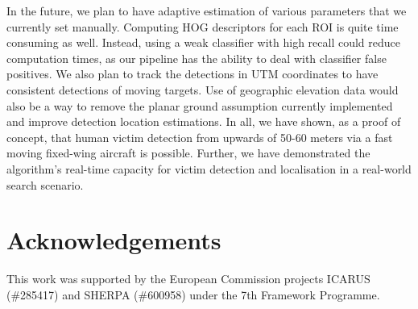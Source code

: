 \documentclass[runningheads]{llncs}
\begin{document}
In the future, we plan to have adaptive estimation of various parameters that we currently set manually. Computing HOG descriptors for each ROI is quite time consuming as well. Instead, using a weak classifier with high recall could reduce computation times, as our pipeline has the ability to deal with classifier false positives. We also plan to track the detections in UTM coordinates to have consistent detections of moving targets. Use of geographic elevation data would also be a way to remove the planar ground assumption currently implemented and improve detection location estimations. In all, we have shown, as a proof of concept, that human victim detection from upwards of 50-60 meters via a fast moving fixed-wing aircraft is possible. Further, we have demonstrated the algorithm's real-time capacity for victim detection and localisation in a real-world search scenario.

\section*{Acknowledgements}

This work was supported by the European Commission projects ICARUS (\#285417) and SHERPA (\#600958) under the 7th Framework Programme.

\nocite{bal:cha:gra:pae}


\end{document}

